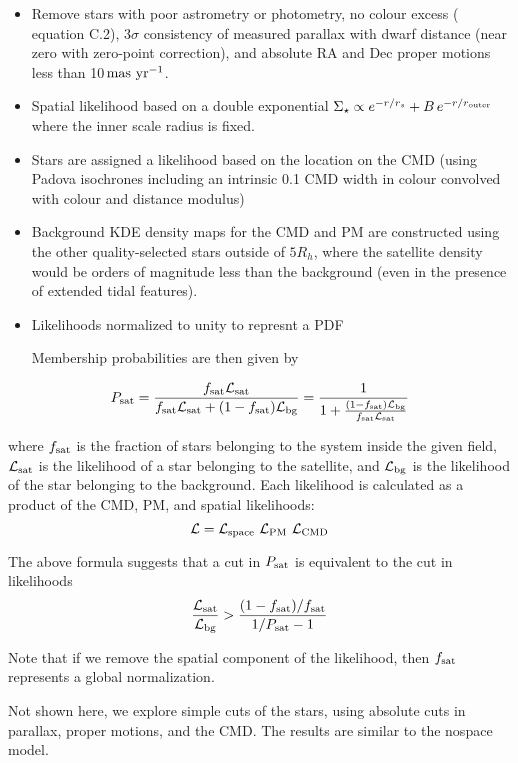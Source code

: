 \begin{itemize}
\item
  Remove stars with poor astrometry or photometry, no colour excess
  (\citet{lindegren+2018} equation C.2), 3\(\sigma\) consistency of
  measured parallax with dwarf distance (near zero with
  \citet{lindegren+2018} zero-point correction), and absolute RA and Dec
  proper motions less than 10\(\,{\rm mas\ yr^{-1}}\).
\item
  Spatial likelihood based on a double exponential
  \(\Sigma_\star \propto e^{-r/r_s} + B\,e^{-r/r_{\rm outer}}\) where
  the inner scale radius is fixed.
\item
  Stars are assigned a likelihood based on the location on the CMD
  (using Padova isochrones including an intrinsic 0.1 CMD width in
  colour convolved with colour and distance modulus)
\item
  Background KDE density maps for the CMD and PM are constructed using
  the other quality-selected stars outside of \(5R_h\), where the
  satellite density would be orders of magnitude less than the
  background (even in the presence of extended tidal features).
\item
  Likelihoods normalized to unity to represnt a PDF

  Membership probabilities are then given by
\end{itemize}

\[
P_{\rm sat} = \frac{f_{\rm sat}{\cal L}_{\rm sat}}{f_{\rm sat}{\cal L}_{\rm sat} + (1-f_{\rm sat}){\cal L}_{\rm bg}} = \frac{1}{1 + \frac{(1-f_{\rm sat}){\cal L}_{\rm bg}}{f_{\rm sat}{\cal L}_{\rm sat} }}
\]

where \(f_{\rm sat}\) is the fraction of stars belonging to the system
inside the given field, \({\cal L}_{\rm sat}\) is the likelihood of a
star belonging to the satellite, and \({\cal L}_{\rm bg}\) is the
likelihood of the star belonging to the background. Each likelihood is
calculated as a product of the CMD, PM, and spatial likelihoods: \[
{\cal L} = {\cal L}_{\rm space}\ {\cal L}_{\rm PM}\ {\cal L}_{\rm CMD}
\]

The above formula suggests that a cut in \(P_{\rm sat}\) is equivalent
to the cut in likelihoods \[
\frac{{\cal L}_{\rm sat}}{{\cal L}_{\rm bg}} > \frac{(1-f_{\rm sat})/f_{\rm sat}}{1/P_{\rm sat}- 1}
\]

Note that if we remove the spatial component of the likelihood, then
\(f_{\rm sat}\) represents a global normalization.

Not shown here, we explore simple cuts of the stars, using absolute cuts
in parallax, proper motions, and the CMD. The results are similar to the
nospace model.

